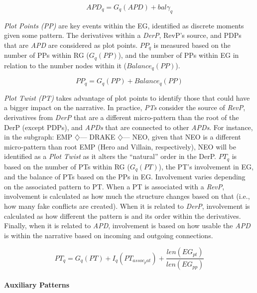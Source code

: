 \begin{equation}
    APD_{q} = G_{q}(APD) + bal\gamma_{q}
\end{equation}

\emph{Plot Points (PP)} are key events within the EG, identified as discrete moments given some pattern. The derivatives within a \textit{DerP}, RevP's source, and PDPs that are \textit{APD} are considered as plot points. $PP_{q}$ is measured based on the number of PPs within RG ($ G_{q}(PP)$), and the number of PPs within EG in relation to the number nodes within it ($Balance_{q}(PP)$).

\begin{equation}
    PP_{q} = G_{q}(PP) + Balance_{q}(PP)
\end{equation}

\emph{Plot Twist (PT)} takes advantage of plot points to identify those that could have a bigger impact on the narrative. In practice, \emph{PTs} consider the source of \textit{RevP}, derivatives from \textit{DerP} that are a different micro-pattern than the root of the DerP (except PDPs), and \textit{APDs} that are connected to other \textit{APDs}. For instance, in the subgraph: EMP $\diamondsuit$--- DRAKE $\diamondsuit$--- NEO, given that NEO is a different micro-pattern than root EMP (Hero and Villain, respectively), NEO will be identified as a \textit{Plot Twist} as it alters the ``natural'' order in the DerP. $PT_{q}$ is based on the number of PTs within RG ($ G_{q}(PT)$), the PT's involvement in EG, and the balance of PTs based on the PPs in EG. Involvement varies depending on the associated pattern to PT. When a PT is associated with a \textit{RevP}, involvement is calculated as how much the structure changes based on that (i.e., how many fake conflicts are created). When it is related to \textit{DerP}, involvement is calculated as how different the pattern is and its order within the derivatives. Finally, when it is related to \textit{APD}, involvement is based on how usable the \textit{APD} is within the narrative based on incoming and outgoing connections.

\begin{equation}
    PT_{q} = G_{q}(PT) + I_{q}(PT_{assoc_pat}) + \frac{len(EG_{pt})}{len(EG_{pp})}
\end{equation}

\paragraph{Auxiliary Patterns}

